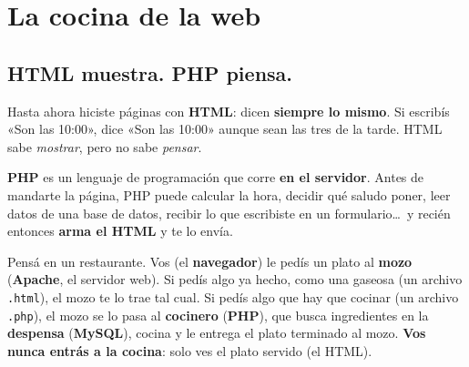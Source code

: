 \begin{center}
\end{center}

\clearpage
\renewcommand{\seccionactual}{LA COCINA DE LA WEB}
\section*{La cocina de la web}

\subsection*{HTML muestra. PHP piensa.}
Hasta ahora hiciste páginas con \textbf{HTML}: dicen \textbf{siempre lo mismo}. Si escribís «Son las 10:00», dice
«Son las 10:00» aunque sean las tres de la tarde. HTML sabe \emph{mostrar}, pero no sabe \emph{pensar}.

\textbf{PHP} es un lenguaje de programación que corre \textbf{en el servidor}. Antes de mandarte la página, PHP puede
calcular la hora, decidir qué saludo poner, leer datos de una base de datos, recibir lo que escribiste en un
formulario\ldots\ y recién entonces \textbf{arma el HTML} y te lo envía.

\begin{analogia}
Pensá en un restaurante. Vos (el \textbf{navegador}) le pedís un plato al \textbf{mozo} (\textbf{Apache}, el servidor web).
Si pedís algo ya hecho, como una gaseosa (un archivo \texttt{.html}), el mozo te lo trae tal cual. Si pedís algo que hay
que cocinar (un archivo \texttt{.php}), el mozo se lo pasa al \textbf{cocinero} (\textbf{PHP}), que busca ingredientes en la
\textbf{despensa} (\textbf{MySQL}), cocina y le entrega el plato terminado al mozo. \textbf{Vos nunca entrás a la cocina}:
solo ves el plato servido (el HTML).
\end{analogia}

